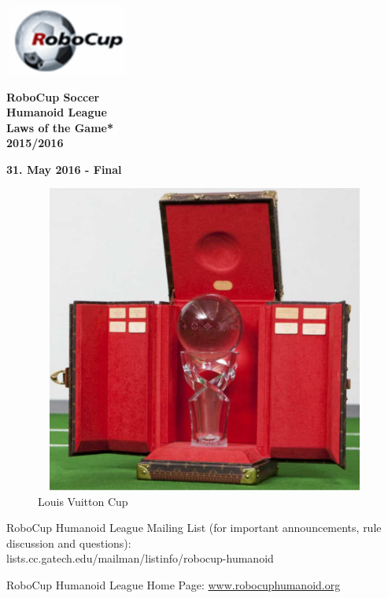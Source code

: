 \documentclass[a4paper]{article}
\title{}
\author{Reinhard Gerndt}
\date{2016-06-23}
\begin{document}
\sffamily

\begin{center}
\includegraphics[width=1.6264in,height=0.9055in]{img/robocup_logo.png}

{\Huge \bfseries
RoboCup Soccer
\\
Humanoid League
\\
Laws of the Game* 
\\ \vspace{0.5cm}
2015/2016 }

\bigskip

{\bfseries 31. May 2016 - Final}

\end{center}

\begin{figure}[h]
\centering
\includegraphics[width=4.5492in,height=3.9945in]{img/award.png}
\captionsetup{labelformat=empty}
\caption{Louis Vuitton Cup}
\end{figure}

RoboCup Humanoid League Mailing List (for important announcements, rule
discussion and questions):\\
\textcolor[rgb]{0.0,0.0,0.49803922}{lists.cc.gatech.edu/mailman/listinfo/robocup-humanoid
}

RoboCup Humanoid League Home Page:
\href{https://www.robocuphumanoid.org/}{\textcolor[rgb]{0.0,0.0,0.49803922}{www.robocuphumanoid.org}}
\end{document}
